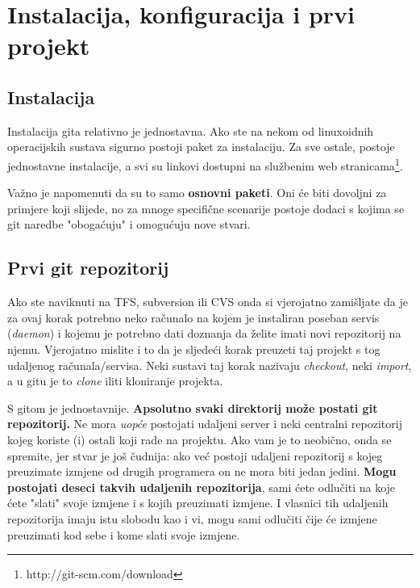 \chapter*{Instalacija, konfiguracija i prvi projekt}

\section*{Instalacija}

Instalacija gita relativno je jednostavna. Ako ste na nekom od linuxoidnih operacijskih sustava sigurno postoji paket za instalaciju. 
Za sve ostale, postoje jednostavne instalacije, a svi su linkovi dostupni na službenim web stranicama\footnote{http://git-scm.com/download}.

Važno je napomenuti da su to samo \textbf{osnovni paketi}. 
Oni će biti dovoljni za primjere koji slijede, no za mnoge specifične scenarije postoje dodaci s kojima se git naredbe "obogaćuju" i omogućuju nove stvari.

\section*{Prvi git repozitorij}

Ako ste naviknuti na TFS, subversion ili CVS onda si vjerojatno zamišljate da je za ovaj korak potrebno neko računalo na kojem je instaliran poseban servis (\emph{daemon}) i kojemu je potrebno dati doznanja da želite imati novi repozitorij na njemu.
Vjerojatno mislite i to da je sljedeći korak preuzeti taj projekt s tog udaljenog računala/servisa.
Neki sustavi taj korak nazivaju \emph{checkout}, neki \emph{import}, a u gitu je to \emph{clone} iliti kloniranje projekta.

S gitom je jednostavnije. 
\textbf{Apsolutno svaki direktorij može postati git repozitorij.}
Ne mora \emph{uopće} postojati udaljeni server i neki centralni repozitorij kojeg koriste (i) ostali koji rade na projektu.
Ako vam je to neobično, onda se spremite, jer stvar je još čudnija: ako već postoji udaljeni repozitorij s kojeg preuzimate izmjene od drugih programera on ne mora biti jedan jedini.
\textbf{Mogu postojati deseci takvih udaljenih repozitorija}, sami ćete odlučiti na koje ćete "slati" svoje izmjene i s kojih preuzimati izmjene.
I vlasnici tih udaljenih repozitorija imaju istu slobodu kao i vi, mogu sami odlučiti čije će izmjene preuzimati kod sebe i kome slati svoje izmjene.

